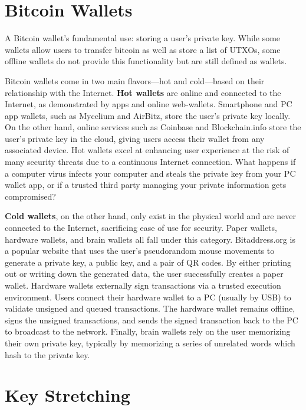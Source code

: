 \documentclass[11pt]{article}
\begin{document}
    \section*{Bitcoin Wallets}
    
    A Bitcoin wallet's fundamental use: storing a user's private key. While some wallets allow users to transfer bitcoin as well as store a list of UTXOs, some offline wallets do not provide this functionality but are still defined as wallets. 
    
    Bitcoin wallets come in two main flavors---hot and cold---based on their relationship with the Internet. \textbf{Hot wallets} are online and connected to the Internet, as demonstrated by apps and online web-wallets. Smartphone and PC app wallets, such as Mycelium and AirBitz, store the user's private key locally. On the other hand, online services such as Coinbase and Blockchain.info store the user's private key in the cloud, giving users access their wallet from any associated device. Hot wallets excel at enhancing user experience at the risk of many security threats due to a continuous Internet connection. What happens if a computer virus infects your computer and steals the private key from your PC wallet app, or if a trusted third party managing your private information gets compromised?
    
    \textbf{Cold wallets}, on the other hand, only exist in the physical world and are never connected to the Internet, sacrificing ease of use for security. Paper wallets, hardware wallets, and brain wallets all fall under this category. Bitaddress.org is a popular website that uses the user's pseudorandom mouse movements to generate a private key, a public key, and a pair of QR codes. By either printing out or writing down the generated data, the user successfully creates a paper wallet. Hardware wallets externally sign transactions via a trusted execution environment. Users connect their hardware wallet to a PC (usually by USB) to validate unsigned and queued transactions. The hardware wallet remains offline, signs the unsigned transactions, and sends the signed transaction back to the PC to broadcast to the network. Finally, brain wallets rely on the user memorizing their own private key, typically by memorizing a series of unrelated words which hash to the private key. 
    
    \section*{Key Stretching}
    
\end{document}
